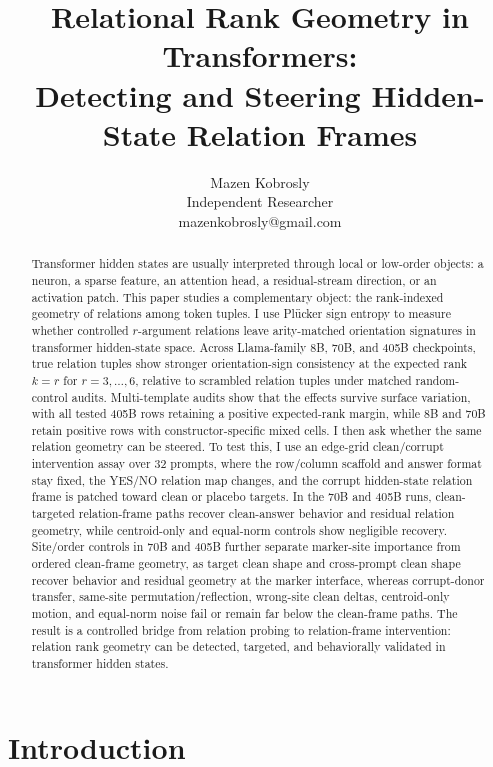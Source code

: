 \documentclass[11pt]{article}
\title{Relational Rank Geometry in Transformers:\\Detecting and Steering Hidden-State Relation Frames}
\author{Mazen Kobrosly\\Independent Researcher\\mazenkobrosly@gmail.com}
\date{}
\begin{document}
\maketitle

\begin{abstract}
Transformer hidden states are usually interpreted through local or low-order objects: a neuron, a sparse feature, an attention head, a residual-stream direction, or an activation patch. This paper studies a complementary object: the rank-indexed geometry of relations among token tuples. I use Pl\"ucker sign entropy to measure whether controlled $r$-argument relations leave arity-matched orientation signatures in transformer hidden-state space. Across Llama-family 8B, 70B, and 405B checkpoints, true relation tuples show stronger orientation-sign consistency at the expected rank $k=r$ for $r=3,\ldots,6$, relative to scrambled relation tuples under matched random-control audits. Multi-template audits show that the effects survive surface variation, with all tested 405B rows retaining a positive expected-rank margin, while 8B and 70B retain positive rows with constructor-specific mixed cells. I then ask whether the same relation geometry can be steered. To test this, I use an edge-grid clean/corrupt intervention assay over 32 prompts, where the row/column scaffold and answer format stay fixed, the YES/NO relation map changes, and the corrupt hidden-state relation frame is patched toward clean or placebo targets. In the 70B and 405B runs, clean-targeted relation-frame paths recover clean-answer behavior and residual relation geometry, while centroid-only and equal-norm controls show negligible recovery. Site/order controls in 70B and 405B further separate marker-site importance from ordered clean-frame geometry, as target clean shape and cross-prompt clean shape recover behavior and residual geometry at the marker interface, whereas corrupt-donor transfer, same-site permutation/reflection, wrong-site clean deltas, centroid-only motion, and equal-norm noise fail or remain far below the clean-frame paths. The result is a controlled bridge from relation probing to relation-frame intervention: relation rank geometry can be detected, targeted, and behaviorally validated in transformer hidden states.
\end{abstract}

\section{Introduction}
\end{document}

